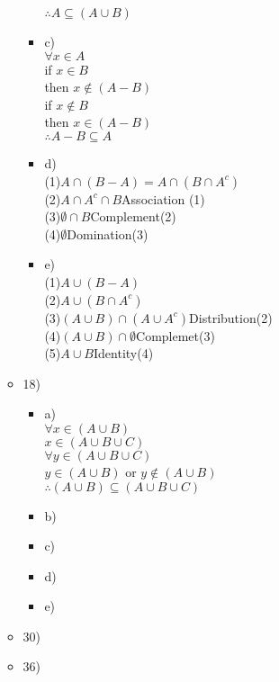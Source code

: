 \documentclass{article}
\begin{document}
\begin{itemize}
\begin{itemize}
\begin{itemize}
      $\therefore A\subseteq (A\cup B)$
    \item
      c)\\
      $\forall x\in A$\\
      if $x\in B$\\
      then $x\notin (A-B)$\\
      if $x\notin B$\\
      then $x\in (A-B)$\\
      $\therefore A-B\subseteq A$
    \item
      d)\\
      (1)$A\cap (B-A) = A\cap (B\cap A^{c})$\\
      (2)$A\cap A^{c}\cap B$\hfill Association (1)\\
      (3)$\emptyset \cap B$\hfill Complement(2)\\
      (4)$\emptyset$\hfill Domination(3)\\
    \item
      e)\\
      (1)$A\cup (B-A)$\\
      (2)$A\cup (B\cap A^{c})$\\
      (3)$(A\cup B)\cap (A\cup A^{c})$\hfill Distribution(2)\\ 
      (4)$(A\cup B)\cap \emptyset$\hfill Complemet(3)\\
      (5)$A\cup B$\hfill Identity(4)\\
  \end{itemize}
  \item
  18)\begin{itemize}
    \item
      a)\\
      $\forall x\in (A\cup B)$\\
      $x\in (A\cup B\cup C)$\\
      $\forall y\in (A\cup B\cup C)$\\
      $y\in (A\cup B)$ or $y\notin (A\cup B)$\\
      $\therefore (A\cup B)\subseteq (A\cup B\cup C)$
    \item
      b)
    \item
      c)
    \item
      d)
    \item
      e)
  \end{itemize}
  \item
  30)
  \item
  36)
  \end{itemize}
\end{itemize}
\end{document}
